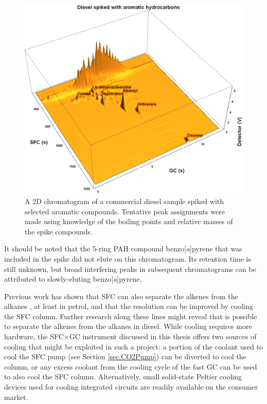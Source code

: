 \begin{figure}
	\centering
	\includegraphics[width=\textwidth]{Figures/Spiked_Diesel_Annotated.png}
	\decoRule	
	
\caption[Peak assignment in spiked diesel sample.]{A 2D chromatogram of a
commercial diesel sample spiked with selected aromatic compounds. Tentative peak
assignments were made using knowledge of the boiling points and relative masses
of the spike compounds.}

	\label{fig:Spiked_Diesel_Annotated} 
\end{figure}

It should be noted that the 5-ring PAH compound benzo[\textit{a}]pyrene that was
included in the spike did not elute on this chromatogram. Its retention time is
still unknown, but broad interfering peaks in subsequent chromatograms can be
attributed to slowly-eluting benzo[\textit{a}]pyrene.

Previous work has shown that SFC can also separate the alkenes from the alkanes
\autocite{Venter1999}, at least in petrol, and that the resolution can be
improved by cooling the SFC column. Further research along these lines might
reveal that is possible to separate the alkenes from the alkanes in diesel.
While cooling requires more hardware, the SFC×GC instrument discussed in this
thesis offers two sources of cooling that might be exploited in such a project:
a portion of the coolant used to cool the SFC pump (see Section
\ref{sec:CO2Pump}) can be diverted to cool the column, or any excess coolant
from the cooling cycle of the fast GC can be used to also cool the SFC column.
Alternatively, small solid-state Peltier cooling devices used for cooling
integrated circuits are readily available on the consumer market.

